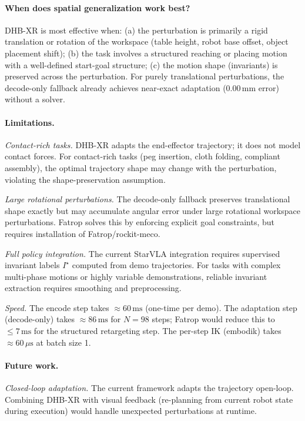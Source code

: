 \paragraph{When does \dhb{} spatial generalization work best?}
DHB-XR is most effective when:
(a) the perturbation is primarily a rigid translation or rotation of the workspace
(table height, robot base offset, object placement shift);
(b) the task involves a structured reaching or placing motion with
a well-defined start-goal structure;
(c) the motion shape (invariants) is preserved across the perturbation.
For purely translational perturbations, the decode-only fallback already achieves
near-exact adaptation ($0.00\,\text{mm}$ error) without a solver.

\paragraph{Limitations.}
\emph{Contact-rich tasks.}
DHB-XR adapts the end-effector trajectory; it does not model contact forces.
For contact-rich tasks (peg insertion, cloth folding, compliant assembly),
the optimal trajectory shape may change with the perturbation, violating
the shape-preservation assumption.

\emph{Large rotational perturbations.}
The decode-only fallback preserves translational shape exactly but may
accumulate angular error under large rotational workspace perturbations.
Fatrop solves this by enforcing explicit goal constraints, but requires
installation of Fatrop/rockit-meco.

\emph{Full policy integration.}
The current StarVLA integration requires supervised invariant labels $I^\star$
computed from demo trajectories.
For tasks with complex multi-phase motions or highly variable demonstrations,
reliable invariant extraction requires smoothing and preprocessing.

\emph{Speed.}
The encode step takes ${\approx}60\,\text{ms}$ (one-time per demo).
The adaptation step (decode-only) takes ${\approx}86\,\text{ms}$ for $N{=}98$ steps;
Fatrop would reduce this to ${\leq}7\,\text{ms}$ for the structured retargeting step.
The per-step IK (embodik) takes ${\approx}60\,\mu\text{s}$ at batch size 1.

\paragraph{Future work.}

\emph{Closed-loop adaptation.}
The current framework adapts the trajectory open-loop.
Combining DHB-XR with visual feedback (re-planning from current robot state
during execution) would handle unexpected perturbations at runtime.

